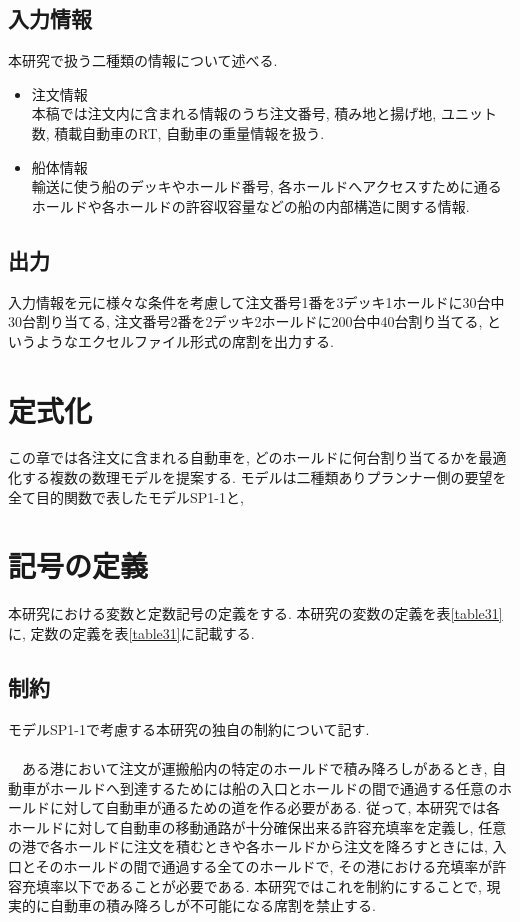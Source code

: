 \documentclass[a4j,11pt,twocolumn]{jsarticle}
\begin{document}
\subsection{入力情報}
本研究で扱う二種類の情報について述べる.
\begin{itemize}

\item 注文情報 \\
本稿では注文内に含まれる情報のうち注文番号, 積み地と揚げ地, ユニット数, 積載自動車のRT, 自動車の重量情報を扱う.

\item 船体情報 \\
輸送に使う船のデッキやホールド番号, 各ホールドへアクセスすために通るホールドや各ホールドの許容収容量などの船の内部構造に関する情報.

\end{itemize}



\subsection{出力}
入力情報を元に様々な条件を考慮して注文番号1番を3デッキ1ホールドに30台中30台割り当てる, 注文番号2番を2デッキ2ホールドに200台中40台割り当てる, というようなエクセルファイル形式の席割を出力する.


\section{定式化}
この章では各注文に含まれる自動車を, どのホールドに何台割り当てるかを最適化する複数の数理モデルを提案する. モデルは二種類ありプランナー側の要望を全て目的関数で表したモデルSP1-1と,
\section{記号の定義}
本研究における変数と定数記号の定義をする. 本研究の変数の定義を表\ref{table31}に, 定数の定義を表\ref{table31}に記載する. \\


\subsection{制約}
モデルSP1-1で考慮する本研究の独自の制約について記す.  \\

 \\
　ある港において注文が運搬船内の特定のホールドで積み降ろしがあるとき, 自動車がホールドへ到達するためには船の入口とホールドの間で通過する任意のホールドに対して自動車が通るための道を作る必要がある. 従って, 本研究では各ホールドに対して自動車の移動通路が十分確保出来る許容充填率を定義し, 任意の港で各ホールドに注文を積むときや各ホールドから注文を降ろすときには, 入口とそのホールドの間で通過する全てのホールドで, その港における充填率が許容充填率以下であることが必要である. 本研究ではこれを制約にすることで, 現実的に自動車の積み降ろしが不可能になる席割を禁止する. \\
\end{document}
